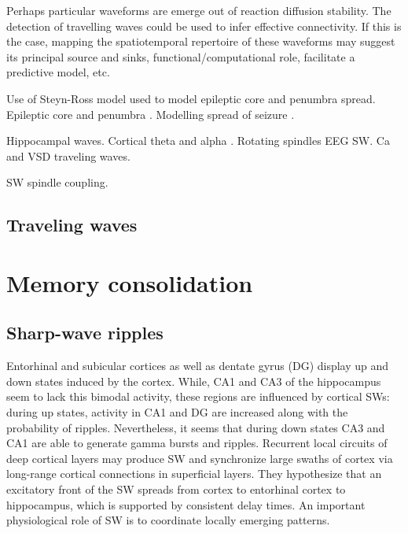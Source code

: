 Perhaps particular waveforms are emerge out of reaction diffusion stability. The detection of travelling waves could be used to infer effective connectivity. If this is the case, mapping the spatiotemporal repertoire of these waveforms may suggest its principal source and sinks, functional/computational role, facilitate a predictive model, etc. \citep{Steyn-Ross}

Use of Steyn-Ross model used to model epileptic core and penumbra spread. Epileptic core and penumbra \citep{Schevon2012}. Modelling spread of seizure \citep{Smith2016a, Martinet2015, Martinet2017}.

Hippocampal waves. Cortical theta and alpha \citep{Zhang2018}.
Rotating spindles \citep{Muller2016}
EEG SW. Ca and VSD traveling waves.

SW spindle coupling.

\subsection*{Traveling waves}

\section*{Memory consolidation}
\subsection*{Sharp-wave ripples}
Entorhinal and subicular cortices as well as dentate gyrus (DG) display up and down states induced by the cortex. While, CA1 and CA3 of the hippocampus seem to lack this bimodal activity, these regions are influenced by cortical SWs: during up states, activity in CA1 and DG are increased along with the probability of ripples. Nevertheless, it seems that during down states CA3 and CA1 are able to generate gamma bursts and ripples.
Recurrent local circuits of deep cortical layers may produce SW and synchronize large swaths of cortex via long-range cortical connections in superficial layers. They hypothesize that an excitatory front of the SW spreads from cortex to entorhinal cortex to hippocampus, which is supported by consistent delay times.
An important physiological role of SW is to coordinate locally emerging patterns.
\cite{Isomura2006}

